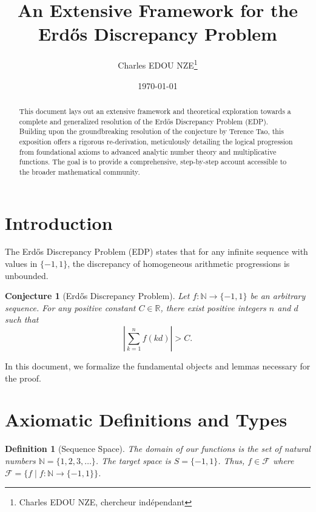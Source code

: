 \documentclass[12pt]{article}
\title{An Extensive Framework for the Erd\H{o}s Discrepancy Problem}
\author{Charles EDOU NZE\thanks{Charles EDOU NZE, chercheur indépendant}}
\date{\today}
\newtheorem{definition}[theorem]{Definition}
\newtheorem{conjecture}[theorem]{Conjecture}
\begin{document}
\maketitle

\begin{abstract}
This document lays out an extensive framework and theoretical exploration towards a complete and generalized resolution of the Erd\H{o}s Discrepancy Problem (EDP). Building upon the groundbreaking resolution of the conjecture by Terence Tao, this exposition offers a rigorous re-derivation, meticulously detailing the logical progression from foundational axioms to advanced analytic number theory and multiplicative functions. The goal is to provide a comprehensive, step-by-step account accessible to the broader mathematical community.
\end{abstract}

\tableofcontents

\section{Introduction}

The Erd\H{o}s Discrepancy Problem (EDP) states that for any infinite sequence with values in $\{-1, 1\}$, the discrepancy of homogeneous arithmetic progressions is unbounded.

\begin{conjecture}[Erd\H{o}s Discrepancy Problem]
Let $f : \mathbb{N} \to \{-1, 1\}$ be an arbitrary sequence. For any positive constant $C \in \mathbb{R}$, there exist positive integers $n$ and $d$ such that
\[
\left| \sum_{k=1}^n f(kd) \right| > C.
\]
\end{conjecture}

In this document, we formalize the fundamental objects and lemmas necessary for the proof.

\section{Axiomatic Definitions and Types}



\begin{definition}[Sequence Space]
The domain of our functions is the set of natural numbers $\mathbb{N} = \{1, 2, 3, \ldots\}$. The target space is $S = \{-1, 1\}$. Thus, $f \in \mathcal{F}$ where $\mathcal{F} = \{ f \mid f : \mathbb{N} \to \{-1, 1\} \}$.
\end{definition}
\end{document}
